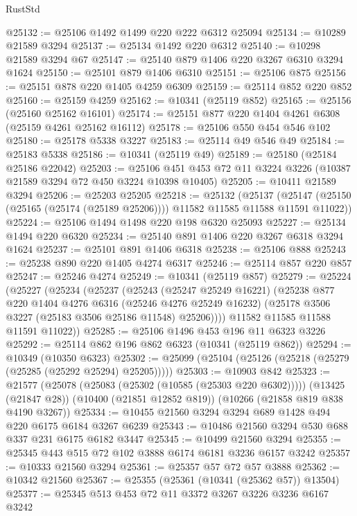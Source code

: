 \begin{lexlean}{RustStd}
\begin{coremodule}
@25132 := @25106 @1492 @1499 @220 @222 @6312 @25094
@25134 := @10289 @21589 @3294
@25137 := @25134 @1492 @220 @6312
@25140 := @10298 @21589 @3294 @67
@25147 := @25140 @879 @1406 @220 @3267 @6310 @3294 @1624
@25150 := @25101 @879 @1406 @6310
@25151 := @25106 @875
@25156 := @25151 @878 @220 @1405 @4259 @6309
@25159 := @25114 @852 @220 @852
@25160 := @25159 @4259
@25162 := @10341 (@25119 @852)
@25165 := @25156 (@25160 @25162 @16101)
@25174 := @25151 @877 @220 @1404 @4261 @6308 (@25159 @4261 @25162 @16112)
@25178 := @25106 @550 @454 @546 @102
@25180 := @25178 @5338 @3227
@25183 := @25114 @49 @546 @49
@25184 := @25183 @5338
@25186 := @10341 (@25119 @49)
@25189 := @25180 (@25184 @25186 @22042)
@25203 := @25106 @451 @453 @72 @11 @3224 @3226 (@10387 @21589 @3294 @72 @450 @3224 @10398 @10405)
@25205 := @10411 @21589 @3294
@25206 := @25203 @25205
@25218 := @25132
    (@25137 (@25147 (@25150 (@25165 (@25174 (@25189 @25206)))) @11582 @11585 @11588 @11591 @11022))
@25224 := @25106 @1494 @1498 @220 @198 @6320 @25093
@25227 := @25134 @1494 @220 @6320
@25234 := @25140 @891 @1406 @220 @3267 @6318 @3294 @1624
@25237 := @25101 @891 @1406 @6318
@25238 := @25106 @888
@25243 := @25238 @890 @220 @1405 @4274 @6317
@25246 := @25114 @857 @220 @857
@25247 := @25246 @4274
@25249 := @10341 (@25119 @857)
@25279 := @25224
    (@25227
      (@25234
        (@25237
          (@25243
            (@25247 @25249 @16221)
            (@25238
              @877
              @220
              @1404
              @4276
              @6316
              (@25246 @4276 @25249 @16232)
              (@25178 @3506 @3227 (@25183 @3506 @25186 @11548) @25206))))
        @11582
        @11585
        @11588
        @11591
        @11022))
@25285 := @25106 @1496 @453 @196 @11 @6323 @3226
@25292 := @25114 @862 @196 @862 @6323 (@10341 (@25119 @862))
@25294 := @10349 (@10350 @6323)
@25302 := @25099 (@25104 (@25126 (@25218 (@25279 (@25285 (@25292 @25294) @25205)))))
@25303 := @10903 @842
@25323 := @21577
    (@25078 (@25083 (@25302 (@10585 (@25303 @220 @6302)))))
    (@13425 (@21847 @28))
    (@10400 (@21851 @12852 @819))
    (@10266 (@21858 @819 @838 @4190 @3267))
@25334 := @10455 @21560 @3294 @3294 @689 @1428 @494 @220 @6175 @6184 @3267 @6239
@25343 := @10486 @21560 @3294 @530 @688 @337 @231 @6175 @6182 @3447
@25345 := @10499 @21560 @3294
@25355 := @25345 @443 @515 @72 @102 @3888 @6174 @6181 @3236 @6157 @3242
@25357 := @10333 @21560 @3294
@25361 := @25357 @57 @72 @57 @3888
@25362 := @10342 @21560
@25367 := @25355 (@25361 (@10341 (@25362 @57)) @13504)
@25377 := @25345 @513 @453 @72 @11 @3372 @3267 @3226 @3236 @6167 @3242

\end{coremodule}
\end{lexlean}
